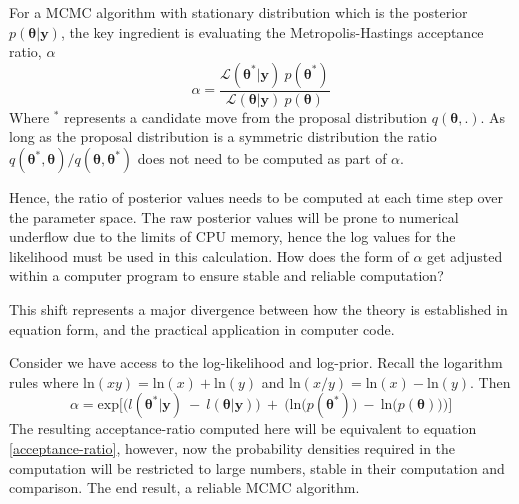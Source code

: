 \begin{tcolorbox}[enhanced jigsaw,breakable,pad at break*=1mm,title=Technical figure 3: Stable computation of likelihood values, title filled,fonttitle=\sffamily\bfseries,fontupper=\sffamily\scriptsize]
\begin{multicols}{2}
\indent For a MCMC algorithm with stationary distribution which is the posterior $p(\bm{\theta}|\bm{y})$, the key ingredient is evaluating the Metropolis-Hastings acceptance ratio, $\alpha$
\begin{equation}
\alpha = \frac{\mathcal{L}(\bm{\theta^*}|\bm{y})\ p(\bm{\theta^*})}{\mathcal{L}(\bm{\theta}|\bm{y})\ p(\bm{\theta})}
\label{acceptance-ratio}
\end{equation}
Where $^*$ represents a candidate move from the proposal distribution $q(\bm{\theta},.)$. As long as the proposal distribution is a symmetric distribution the ratio $q(\bm{\theta^*},\bm{\theta})/q(\bm{\theta},\bm{\theta^*})$ does not need to be computed as part of $\alpha$.\par

\indent Hence, the ratio of posterior values needs to be computed at each time step over the parameter space. The raw posterior values will be prone to numerical underflow due to the limits of CPU memory, hence the log values for the likelihood must be used in this calculation. How does the form of $\alpha$ get adjusted within a computer program to ensure stable and reliable computation?\par

\indent This shift represents a major divergence between how the theory is established in equation form, and the practical application in computer code.\par

\indent Consider we have access to the log-likelihood and log-prior. Recall the logarithm rules where $\text{ln}(xy) = \text{ln}(x)+\text{ln}(y)$ and $\text{ln}(x/y) = \text{ln}(x)-\text{ln}(y)$. Then
\begin{equation}
\alpha = \text{exp}\Big[\Big(l(\bm{\theta^*}|\bm{y})\ -\ l(\bm{\theta}|\bm{y})\Big)\ +\ \Big(\text{ln}\big(p(\bm{\theta^*})\big)\ -\ \text{ln}\big(p(\bm{\theta})\big)\Big)\Big]
\label{stable-acceptance-ratio}
\end{equation}
The resulting acceptance-ratio computed here will be equivalent to equation \ref{acceptance-ratio}, however, now the probability densities required in the computation will be restricted to large numbers, stable in their computation and comparison. The end result, a reliable MCMC algorithm.
\end{multicols}
\end{tcolorbox}

